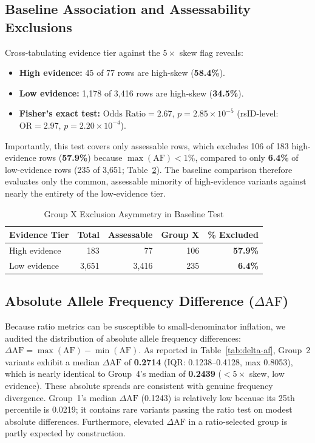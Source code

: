 \documentclass[conference]{IEEEtran}
\begin{document}
\begin{table}[!t]
\subsection{Baseline Association and Assessability Exclusions}

Cross-tabulating evidence tier against the $5\times$ skew flag reveals:
\begin{itemize}
    \item \textbf{High evidence:} 45 of 77 rows are high-skew (\textbf{58.4\%}).
    \item \textbf{Low evidence:} 1,178 of 3,416 rows are high-skew (\textbf{34.5\%}).
    \item \textbf{Fisher's exact test:} $\text{Odds Ratio} = 2.67$, $p = 2.85 \times 10^{-5}$ (rsID-level: $\text{OR} = 2.97$, $p = 2.20 \times 10^{-4}$).
\end{itemize}
Importantly, this test covers only assessable rows, which excludes 106 of 183 high-evidence rows (\textbf{57.9\%}) because $\max(\text{AF}) < 1\%$, compared to only \textbf{6.4\%} of low-evidence rows (235 of 3,651; Table~\ref{tab:groupx-exclusion}).
The baseline comparison therefore evaluates only the common, assessable minority of high-evidence variants against nearly the entirety of the low-evidence tier.

\begin{table}[!t]
\centering
\caption{Group X Exclusion Asymmetry in Baseline Test}
\label{tab:groupx-exclusion}
\renewcommand{\arraystretch}{1.15}
\begin{tabular}{|l|r|r|r|r|}
\hline
\textbf{Evidence Tier} & \textbf{Total} & \textbf{Assessable} & \textbf{Group X} & \textbf{\% Excluded} \\
\hline
High evidence &   183 &    77 & 106 & \textbf{57.9\%} \\
\hline
Low evidence  & 3,651 & 3,416 & 235 &  \textbf{6.4\%} \\
\hline
\end{tabular}
\end{table}

\subsection{Absolute Allele Frequency Difference ($\Delta\text{AF}$)}

Because ratio metrics can be susceptible to small-denominator inflation, we audited the distribution of absolute allele frequency differences:
$\Delta\text{AF} = \max(\text{AF}) - \min(\text{AF})$.
As reported in Table~\ref{tab:delta-af}, Group~2 variants exhibit a median $\Delta\text{AF}$ of \textbf{0.2714} (IQR: 0.1238--0.4128, max 0.8053), which is nearly identical to Group~4's median of \textbf{0.2439} ($< 5\times$ skew, low evidence).
These absolute spreads are consistent with genuine frequency divergence.
Group~1's median $\Delta\text{AF}$ (0.1243) is relatively low because its 25th percentile is 0.0219; it contains rare variants passing the ratio test on modest absolute differences.
Furthermore, elevated $\Delta\text{AF}$ in a ratio-selected group is partly expected by construction.


\end{table}
\end{document}
